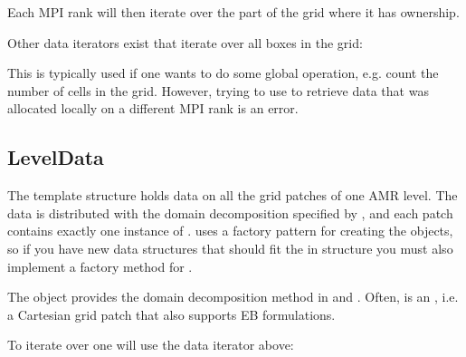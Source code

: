 \documentclass[letterpaper,10pt,english]{sphinxmanual}
\begin{document}
Each MPI rank will then iterate  over the part of the grid where it has ownership.

Other data iterators exist that iterate over all boxes in the grid:

\begin{sphinxVerbatim}[commandchars=\\\{\},formatcom=\scriptsize]
      
\end{sphinxVerbatim}

This is typically used if one wants to do some global operation, e.g. count the number of cells in the grid.
However, trying to use  to retrieve data that was allocated locally on a different MPI rank is an error.


\subsection{LevelData}
\label{\detokenize{Source/ChomboBasics:leveldata}}
The  template structure holds data on all the grid patches of one AMR level.
The data is distributed with the domain decomposition specified by , and each patch contains exactly one instance of .
 uses a factory pattern for creating the  objects, so if you have new data structures that should fit the in  structure you must also implement a factory method for .

The  object provides the domain decomposition method in  and .
Often,  is an , i.e. a Cartesian grid patch that also supports EB formulations.

To iterate over  one will use the data iterator above:
\end{document}

